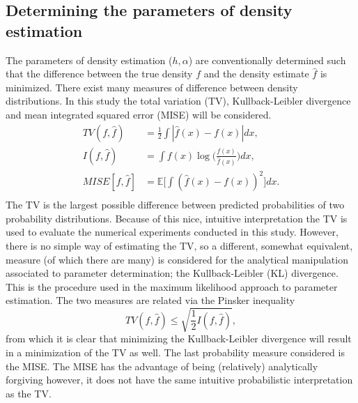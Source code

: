\documentclass[
twoside,
openright,
titlepage,
numbers=noenddot,
headinclude,%
footinclude=true,
dottedtoc, %
ngerman,
american, %
pagesize=pdftex,
]{book}
\begin{document}
	\subsection{Determining the parameters of density estimation}
	The parameters of density estimation ($h,\alpha$) are conventionally determined such that the difference between the true density $f$ and the density estimate $\hat{f}$ is minimized. There exist many measures of difference between density distributions. In this study the total variation (TV), Kullback-Leibler divergence and mean integrated squared error (MISE) will be considered.
	\begin{equation}
		\begin{split}
			TV(f,\hat{f})&=\frac{1}{2}\int |\hat{f}(x)-f(x)|dx,\\
			I(f,\hat{f})&=\int f(x)\log\bigg(\frac{f(x)}{\hat{f}(x)}\bigg)dx,\\
			MISE[f,\hat{f}]&= \mathbb{E}\bigg[\int(\hat{f}(x)-f(x))^2\bigg]dx.\\
		\end{split}
	\end{equation}
	The TV is the largest possible difference between predicted probabilities of two probability distributions. Because of this nice, intuitive interpretation the TV is used to evaluate the numerical experiments conducted in this study. However, there is no simple way of estimating the TV, so a different, somewhat equivalent, measure (of which there are many) is considered for the analytical manipulation associated to parameter determination; the Kullback-Leibler (KL) divergence. This is the procedure used in the maximum likelihood approach to parameter estimation. The two measures are related via the Pinsker inequality
	\begin{equation}
		TV(f,\hat{f})\leq \sqrt{\frac{1}{2}I(f,\hat{f})},
		\label{Pinsker}
	\end{equation}
	from which it is clear that minimizing the Kullback-Leibler divergence will result in a minimization of the TV as well. The last probability measure considered is the MISE. The MISE has the advantage of being (relatively) analytically forgiving however, it does not have the same intuitive probabilistic interpretation as the TV.
	
\end{document}
